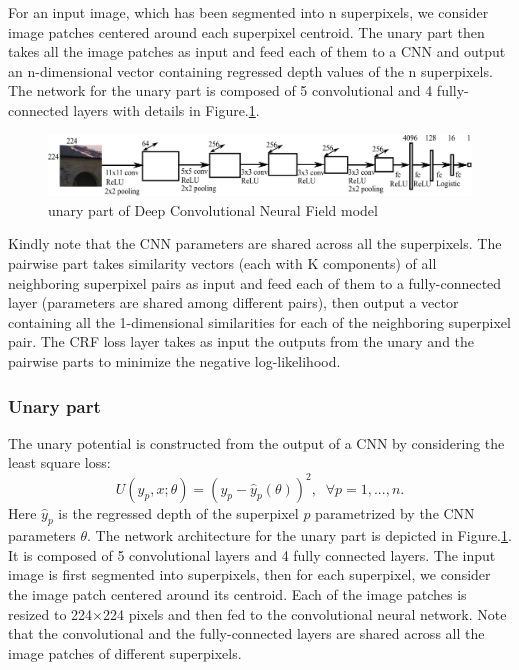 \documentclass[10pt,twocolumn,letterpaper]{article}
\begin{document}
For an input image, which has been segmented into n superpixels, we 
consider image patches centered around each superpixel centroid. The unary part 
then takes all the image patches as input and feed each of them to a CNN and 
output an n-dimensional vector containing regressed depth values of the n 
superpixels. The network for the unary part is composed of 5 convolutional and 
4 fully-connected layers with details in Figure.\ref{fig:unary}. 
\begin{figure}
\includegraphics[width=\linewidth]{../presentation/fig/cnn_unary.pdf}
\caption{unary part of Deep Convolutional Neural Field model}
\label{fig:unary}
\end{figure}

Kindly note that the CNN parameters are shared across all the superpixels. 
The pairwise part takes similarity vectors (each with K components) of all 
neighboring superpixel pairs as input and feed each of them to a 
fully-connected layer (parameters are shared among different pairs), then output 
a vector containing all the 1-dimensional similarities for each of the neighboring superpixel pair. The CRF loss layer takes as input the outputs from 
the unary and the pairwise parts to minimize the negative log-likelihood.
\subsubsection{Unary part}
The unary potential is constructed from the output of a CNN by considering the least square loss:
\begin{equation}\label{eq:unary}
U(y_{p}, x;\theta) = (y_p - \hat{y}_p (\theta))^2, \;\; \forall p=1,...,n.
\end{equation}
Here $\hat{y}_p$ is the regressed depth of the superpixel $p$ parametrized by 
the CNN parameters $\theta$. The network architecture for the unary part is 
depicted in Figure.\ref{fig:unary}. It is composed of 5 convolutional layers 
and 4 fully connected layers. The input image is first segmented into 
superpixels, then for each superpixel, we consider the image patch centered 
around its centroid. Each of the image patches is resized to 224×224 pixels and 
then fed to the convolutional neural network. Note that the convolutional and 
the fully-connected layers are shared across all the image patches of different 
superpixels.
\end{document}
